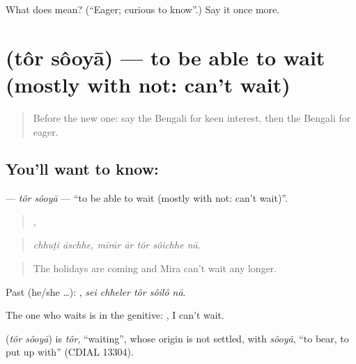 \begin{tcolorbox}[breakable,colback=teal!4,colframe=teal!35!black,title={Before you move on}]
What does  mean? (\textquotedblleft{}Eager; curious to know\textquotedblright{}.) Say it once more.
\end{tcolorbox}
\section[\texorpdfstring{\bn{তর} \bn{সওয়া} (tôr sôoyā)}{তর সওয়া (tôr sôoyā)}]{  (tôr sôoyā) — to be able to wait (mostly with not: can't wait)}

\label{lesson:BN-C455-tor-sooya}



\begin{quote}
Before the new one: say the Bengali for keen interest, then the Bengali for eager.
\end{quote}

\subsection*{You'll want to know:  }
\textbf{ } — \emph{tôr sôoyā} — \textquotedblleft{}to be able to wait (mostly with not: can't wait)\textquotedblright{}.

\begin{quote}
 ,     
\end{quote}

\begin{quote}
\emph{chhuṭi āschhe, mīrār ār tôr sôichhe nā.}
\end{quote}

\begin{quote}
The holidays are coming and Mira can't wait any longer.
\end{quote}

Past (he/she …):     , \emph{sei chheler tôr sôilô nā}.

The one who waits is in the genitive:    , I can't wait.

\begin{cousinweb}
\textbf{ } (\emph{tôr sôoyā}) is \emph{tôr}, \textquotedblleft{}waiting\textquotedblright{}, whose origin is not settled, with \emph{sôoyā}, \textquotedblleft{}to bear, to put up with\textquotedblright{} (CDIAL 13304).
\end{cousinweb}

